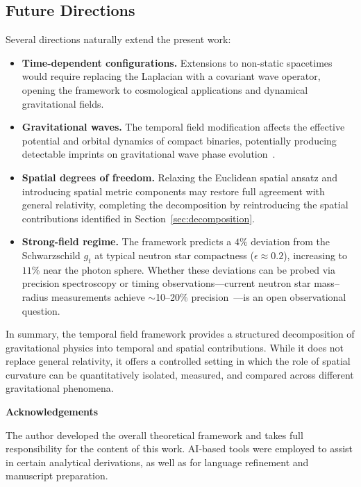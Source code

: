 \documentclass[12pt]{article}
\begin{document}
\subsection{Future Directions}
\label{sec:future_directions}

Several directions naturally extend the present work:

\begin{itemize}
\item \textbf{Time-dependent configurations.}
Extensions to non-static spacetimes would require replacing the Laplacian with a covariant wave operator, opening the framework to cosmological applications and dynamical gravitational fields.

\item \textbf{Gravitational waves.}
The temporal field modification affects the effective potential and orbital dynamics of compact binaries, potentially producing detectable imprints on gravitational wave phase evolution~\cite{Abbott2016}.

\item \textbf{Spatial degrees of freedom.}
Relaxing the Euclidean spatial ansatz and introducing spatial metric components may restore full agreement with general relativity, completing the decomposition by reintroducing the spatial contributions identified in Section~\ref{sec:decomposition}.

\item \textbf{Strong-field regime.}
The framework predicts a $4\%$ deviation from the Schwarzschild $g_t$ at typical neutron star compactness ($\epsilon \approx 0.2$), increasing to $11\%$ near the photon sphere. Whether these deviations can be probed via precision spectroscopy or timing observations---current neutron star mass--radius measurements achieve $\sim$10--20\% precision~\cite{Ozel2016}---is an open observational question.
\end{itemize}

In summary, the temporal field framework provides a structured decomposition of gravitational physics into temporal and spatial contributions. While it does not replace general relativity, it offers a controlled setting in which the role of spatial curvature can be quantitatively isolated, measured, and compared across different gravitational phenomena.

\vspace{1em}
\noindent\textbf{Acknowledgements}

\vspace{0.5em}
\noindent The author developed the overall theoretical framework and takes full responsibility for the content of this work. AI-based tools were employed to assist in certain analytical derivations, as well as for language refinement and manuscript preparation.
\end{document}
